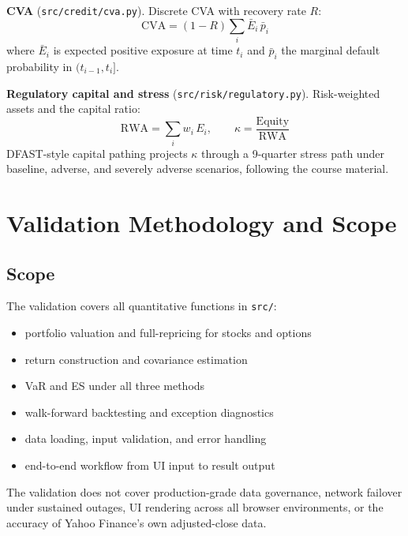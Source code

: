 \documentclass[11pt]{article}
\newcommand{\code}[1]{\texttt{#1}}
\begin{document}
\textbf{CVA} (\code{src/credit/cva.py}).  Discrete CVA with recovery rate
$R$:
\begin{equation}
  \mathrm{CVA} = (1-R)\sum_i \bar{E}_i\,\bar{p}_i
  \label{eq:cva}
\end{equation}
where $\bar{E}_i$ is expected positive exposure at time $t_i$ and $\bar{p}_i$
the marginal default probability in $(t_{i-1}, t_i]$.

\textbf{Regulatory capital and stress} (\code{src/risk/regulatory.py}).
Risk-weighted assets and the capital ratio:
\begin{equation}
  \mathrm{RWA} = \sum_i w_i\, E_i,
  \qquad
  \kappa = \frac{\mathrm{Equity}}{\mathrm{RWA}}
  \label{eq:rwa}
\end{equation}
DFAST-style capital pathing projects $\kappa$ through a 9-quarter stress path
under baseline, adverse, and severely adverse scenarios, following the course
material.

\section{Validation Methodology and Scope}

\subsection{Scope}

The validation covers all quantitative functions in \code{src/}:
\begin{itemize}
  \item portfolio valuation and full-repricing for stocks and options
  \item return construction and covariance estimation
  \item VaR and ES under all three methods
  \item walk-forward backtesting and exception diagnostics
  \item data loading, input validation, and error handling
  \item end-to-end workflow from UI input to result output
\end{itemize}  The validation
does not cover production-grade data governance, network failover under sustained
outages, UI rendering across all browser environments, or the accuracy of Yahoo
Finance's own adjusted-close data.
\end{document}
